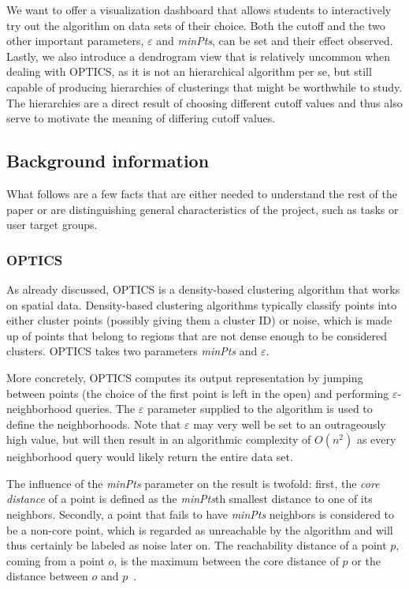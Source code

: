 \documentclass{vgtc} %
\begin{document}
We want to offer a visualization dashboard that allows students to
interactively try out the algorithm on data sets of their choice. Both the
cutoff and the two other important parameters, $\varepsilon$ and \emph{minPts}, can
be set and their effect observed. Lastly, we also introduce a dendrogram view
that is relatively uncommon when dealing with OPTICS, as it is not an hierarchical
algorithm per se, but still capable of producing hierarchies of clusterings
that might be worthwhile to study. The hierarchies are a direct result of
choosing different cutoff values and thus also serve to motivate the meaning of
differing cutoff values.

\subsection{Background information}

What follows are a few facts that are either needed to understand the rest
of the paper or are distinguishing general characteristics of the project,
such as tasks or user target groups.

\subsubsection{OPTICS}

As already discussed, OPTICS is a density-based clustering algorithm that works
on spatial data. Density-based clustering algorithms typically classify points
into either cluster points (possibly giving them a cluster ID) or noise, which
is made up of points that belong to regions that are not dense enough to be
considered clusters. OPTICS takes two parameters \emph{minPts} and $\varepsilon$.

More concretely, OPTICS computes its output representation by jumping between
points (the choice of the first point is left in the open) and performing
$\varepsilon$-neighborhood queries. The $\varepsilon$ parameter supplied to the
algorithm is used to define the neighborhoods. Note that $\varepsilon$ may very
well be set to an outrageously high value, but will then result in an
algorithmic complexity of $O(n^2)$ as every neighborhood query would likely
return the entire data set.

The influence of the \emph{minPts} parameter on the result is twofold: first,
the \emph{core distance} of a point is defined as the \emph{minPts}th smallest
distance to one of its neighbors. Secondly, a point that fails to have
\emph{minPts} neighbors is considered to be a non-core point, which is regarded
as unreachable by the algorithm and will thus certainly be labeled as noise
later on. The reachability distance of a point $p$, coming from a point $o$, is
the maximum between the core distance of $p$ or the distance between $o$ and
$p$~\cite{optics-wiki}.
\end{document}
